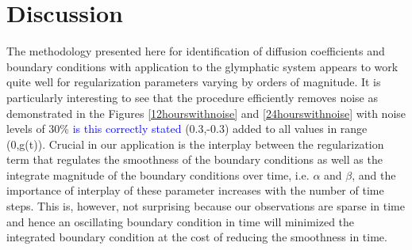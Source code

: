 \documentclass[11pt,a4paper]{article}
\newcommand{\kam}[1]{\textcolor{blue}{#1}}
\begin{document}
%
% 

\section{Discussion}

The methodology presented here for identification of diffusion coefficients and boundary conditions with application to the glymphatic system appears to work quite 
well for regularization parameters varying by orders of magnitude. It is particularly interesting to see that the procedure efficiently removes noise as demonstrated
in the Figures \ref{12hourswithnoise} and \ref{24hourswithnoise} with noise levels of 30\% \kam{is this correctly stated}{\color{red} (0.3,-0.3) added to all values in range (0,g(t))}. 
Crucial in our application is the interplay between the regularization term that regulates the smoothness of the boundary conditions as well as
the integrate magnitude of the boundary conditions over time, i.e. $\alpha$ and $\beta$, and the
importance of interplay of these parameter increases with the number of time steps. This is, however, not surprising because our observations are sparse
in time and hence an oscillating boundary condition in time will minimized the integrated boundary condition at the cost of reducing the smoothness in time.         
\end{document}
